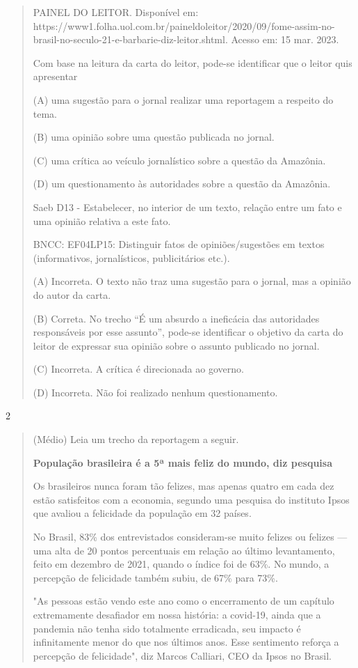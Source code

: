 \begin{itemize}
{{{\begin{itemize}
\begin{itemize}
\begin{itemize}
\begin{quote}
PAINEL DO LEITOR. Disponível em:
https://www1.folha.uol.com.br/paineldoleitor/2020/09/fome-assim-no-brasil-no-seculo-21-e-barbarie-diz-leitor.shtml.
Acesso em: 15 mar. 2023.

Com base na leitura da carta do leitor, pode-se identificar que o leitor
quis apresentar

(A) uma sugestão para o jornal realizar uma reportagem a respeito do
tema.

(B) uma opinião sobre uma questão publicada no jornal.

(C) uma crítica ao veículo jornalístico sobre a questão da Amazônia.

(D) um questionamento às autoridades sobre a questão da Amazônia.

Saeb D13 - Estabelecer, no interior de um texto, relação entre um fato e
uma opinião relativa a este fato.

BNCC: EF04LP15: Distinguir fatos de opiniões/sugestões em textos
(informativos, jornalísticos, publicitários etc.).

(A) Incorreta. O texto não traz uma sugestão para o jornal, mas a
opinião do autor da carta.

(B) Correta. No trecho ``É um absurdo a ineficácia das autoridades
responsáveis por esse assunto'', pode-se identificar o objetivo da carta
do leitor de expressar sua opinião sobre o assunto publicado no jornal.

(C) Incorreta. A crítica é direcionada ao governo.

(D) Incorreta. Não foi realizado nenhum questionamento.
\end{quote}

\num{2}

\begin{quote}
(Médio) Leia um trecho da reportagem a seguir.

\textbf{População brasileira é a 5ª mais feliz do mundo, diz pesquisa}

Os brasileiros nunca foram tão felizes, mas apenas quatro em cada dez
estão satisfeitos com a economia, segundo uma pesquisa do instituto
Ipsos que avaliou a felicidade da população em 32 países.

No Brasil, 83\% dos entrevistados consideram-se muito felizes ou felizes
--- uma alta de 20 pontos percentuais em relação ao último levantamento,
feito em dezembro de 2021, quando o índice foi de 63\%. No mundo, a
percepção de felicidade também subiu, de 67\% para 73\%.

"As pessoas estão vendo este ano como o encerramento de um capítulo
extremamente desafiador em nossa história: a covid-19, ainda que a
pandemia não tenha sido totalmente erradicada, seu impacto é
infinitamente menor do que nos últimos anos. Esse sentimento reforça a
percepção de felicidade", diz Marcos Calliari, CEO da Ipsos no Brasil.


\end{quote}
\end{itemize}
\end{itemize}
\end{itemize}}}}
\end{itemize}
